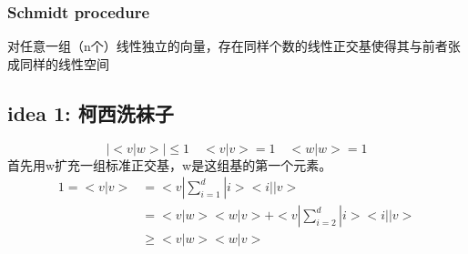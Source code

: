 \documentclass[a4paper, 11pt]{article} %
\begin{document}
\subsubsection{Schmidt procedure}
对任意一组（n个）线性独立的向量，存在同样个数的线性正交基使得其与前者张成同样的线性空间


\subsection{idea 1: 柯西洗袜子}
$$
|<v|w>| \leq 1 \quad <v|v> = 1 \quad <w|w> = 1
$$
首先用w扩充一组标准正交基，w是这组基的第一个元素。
\begin{align*}
1 = <v|v> & = <v| \sum_{i = 1}^d |i><i| |v>\\
& = <v|w><w|v> + <v| \sum_{i = 2}^d |i><i| |v>\\
& \geq <v|w><w|v>
\end{align*}
\end{document}
